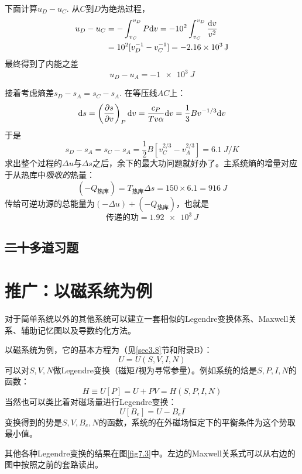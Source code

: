 \begin{example}
下面计算$u_D - u_C$. 从$C$到$D$为绝热过程，
\[
\begin{split}
	u_D - u_C &= -\int_{v_C}^{v_D} P\mathrm{d} v = -10^2 \int_{v_C}^{v_D} \frac{\mathrm{d} v}{v^2} \\
	&= 10^2 [v_D^{-1} - v_C^{-1} ] = -\SI{2.16e3}{J}
\end{split}
\]
最终得到了内能之差
\[
	u_D - u_A = -\SI{1e3}{J}
\]

接着考虑熵差$s_D - s_A = s_C - s_A$. 在等压线$AC$上：
\[
	\mathrm{d} s = \left( \frac{\partial s}{\partial v} \right)_P \mathrm{d} v = \frac{c_P}{Tv\alpha} \mathrm{d} v = \frac{1}{3} B v^{-1/3} \mathrm{d} v
\]
于是 
\[
	s_D - s_A = s_C - s_A = \frac{1}{2} B \left[v_C^{2/3} - v_A^{2/3} \right] = \SI{6.1}{J \per K}
\]
求出整个过程的$\Delta u$与$\Delta s$之后，余下的最大功问题就好办了。主系统熵的增量对应于从热库中{\it 吸收的}热量：
\[
	(-Q_{\text{热库}}) = T_{\text{热库}} \Delta s = 150 \times 6.1 = \SI{916}{J}
\]
传给可逆功源的总能量为$(-\Delta u) + (-Q_{\text{热库}})$，也就是 
\[
	\text{传递的功} = \SI{1.92e3}{J}
\]

\end{example}


\subsection*{\sout{二十多道}习题}



\section{推广：以磁系统为例}
\label{sec7.5}
对于简单系统以外的其他系统可以建立一套相似的Legendre变换体系、Maxwell关系、辅助记忆图以及导数约化方法。

以磁系统为例，它的基本方程为（见\ref{sec3.8}节和附录B）：
\begin{equation}
	U = U(S, V, I, N)
\label{equ7.52}
\end{equation}
可以对$S, V, N$做Legendre变换（磁矩$I$视为寻常参量）。例如系统的焓是$S, P, I, N$的函数：
\begin{equation}
	H \equiv U[P] = U + PV = H(S, P, I, N)
\label{equ7.53}
\end{equation}
当然也可以类比着对磁场量进行Legendre变换：
\begin{equation}
	U[B_e] = U - B_e I 
\label{equ7.54}
\end{equation}
变换得到的势是$S, V, B_e, N$的函数，系统的在外磁场恒定下的平衡条件为这个势取最小值。

其他各种Legendre变换的结果在图\ref{fig7.3}中。左边的Maxwell关系式可以从右边的图中按照之前的套路读出。

